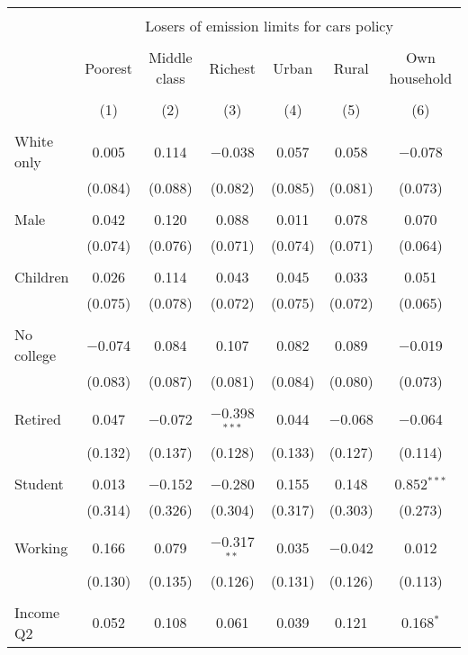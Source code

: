
\begin{tabular}{@{\extracolsep{5pt}}lcccccc} 
\\[-1.8ex]\hline 
\hline \\[-1.8ex] 
 & \multicolumn{6}{c}{Losers of emission limits for cars policy} \\ 
\cline{2-7} 
\\[-1.8ex] & Poorest & Middle class & Richest & Urban & Rural & Own household \\ 
\\[-1.8ex] & (1) & (2) & (3) & (4) & (5) & (6)\\ 
\hline \\[-1.8ex] 
 White only & 0.005 & 0.114 & $-$0.038 & 0.057 & 0.058 & $-$0.078 \\ 
  & (0.084) & (0.088) & (0.082) & (0.085) & (0.081) & (0.073) \\ 
  & & & & & & \\ 
 Male & 0.042 & 0.120 & 0.088 & 0.011 & 0.078 & 0.070 \\ 
  & (0.074) & (0.076) & (0.071) & (0.074) & (0.071) & (0.064) \\ 
  & & & & & & \\ 
 Children & 0.026 & 0.114 & 0.043 & 0.045 & 0.033 & 0.051 \\ 
  & (0.075) & (0.078) & (0.072) & (0.075) & (0.072) & (0.065) \\ 
  & & & & & & \\ 
 No college & $-$0.074 & 0.084 & 0.107 & 0.082 & 0.089 & $-$0.019 \\ 
  & (0.083) & (0.087) & (0.081) & (0.084) & (0.080) & (0.073) \\ 
  & & & & & & \\ 
 Retired & 0.047 & $-$0.072 & $-$0.398$^{***}$ & 0.044 & $-$0.068 & $-$0.064 \\ 
  & (0.132) & (0.137) & (0.128) & (0.133) & (0.127) & (0.114) \\ 
  & & & & & & \\ 
 Student & 0.013 & $-$0.152 & $-$0.280 & 0.155 & 0.148 & 0.852$^{***}$ \\ 
  & (0.314) & (0.326) & (0.304) & (0.317) & (0.303) & (0.273) \\ 
  & & & & & & \\ 
 Working & 0.166 & 0.079 & $-$0.317$^{**}$ & 0.035 & $-$0.042 & 0.012 \\ 
  & (0.130) & (0.135) & (0.126) & (0.131) & (0.126) & (0.113) \\ 
  & & & & & & \\ 
 Income Q2 & 0.052 & 0.108 & 0.061 & 0.039 & 0.121 & 0.168$^{*}$ \\ 

\end{tabular}

